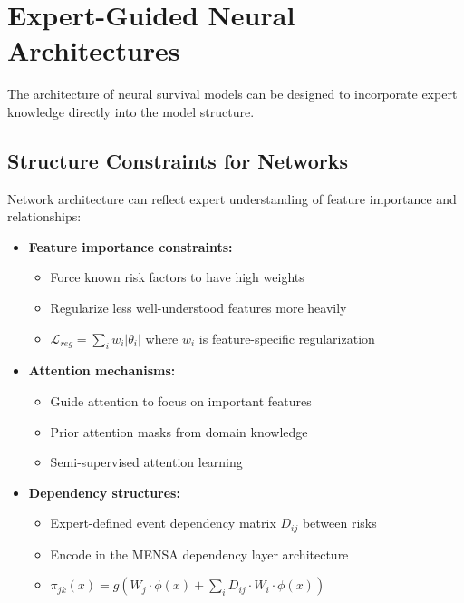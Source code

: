 \section{Expert-Guided Neural Architectures}

The architecture of neural survival models can be designed to incorporate expert knowledge directly into the model structure.

\subsection{Structure Constraints for Networks}

Network architecture can reflect expert understanding of feature importance and relationships:

\begin{itemize}
    \item \textbf{Feature importance constraints:}
    \begin{itemize}
        \item Force known risk factors to have high weights
        \item Regularize less well-understood features more heavily
        \item $\mathcal{L}_{reg} = \sum_i w_i |\theta_i|$ where $w_i$ is feature-specific regularization
    \end{itemize}

    \item \textbf{Attention mechanisms:}
    \begin{itemize}
        \item Guide attention to focus on important features
        \item Prior attention masks from domain knowledge
        \item Semi-supervised attention learning
    \end{itemize}

    \item \textbf{Dependency structures:}
    \begin{itemize}
        \item Expert-defined event dependency matrix $D_{ij}$ between risks
        \item Encode in the MENSA dependency layer architecture
        \item $\pi_{jk}(x) = g(W_j \cdot \phi(x) + \sum_i D_{ij} \cdot W_i \cdot \phi(x))$
    \end{itemize}
\end{itemize}

